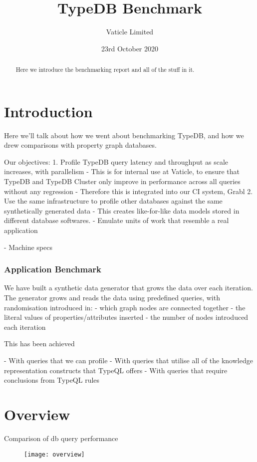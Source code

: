 \documentclass{article}
\begin{document}
\title{TypeDB Benchmark}
\date{23rd October 2020}
\author{Vaticle Limited}

\maketitle

\begin{abstract}
Here we introduce the benchmarking report and all of the stuff in it.
\end{abstract}

\section{Introduction}
Here we'll talk about how we went about benchmarking TypeDB, and how we drew comparisons with property graph databases.

Our objectives:
1. Profile TypeDB query latency and throughput as scale increases, with parallelism
    - This is for internal use at Vaticle, to ensure that TypeDB and TypeDB Cluster only improve in performance across all queries without any regression
    - Therefore this is integrated into our CI system, Grabl
2. Use the same infrastructure to profile other databases against the same synthetically generated data
    - This creates like-for-like data models stored in different database softwares.
    - Emulate units of work that resemble a real application

- Machine specs

\subsubsection{Application Benchmark}

We have built a synthetic data generator that grows the data over each iteration. The generator grows and reads the data using predefined queries, with randomisation introduced in:
- which graph nodes are connected together
- the literal values of properties/attributes inserted
- the number of nodes introduced each iteration

This has been achieved

- With queries that we can profile
- With queries that utilise all of the knowledge representation constructs that TypeQL offers
- With queries that require conclusions from TypeQL rules


\section{Overview}
Comparison of db query performance

\begin{figure}[H]
\centering
\texttt{[image: overview]}
\end{figure}
\end{document}
